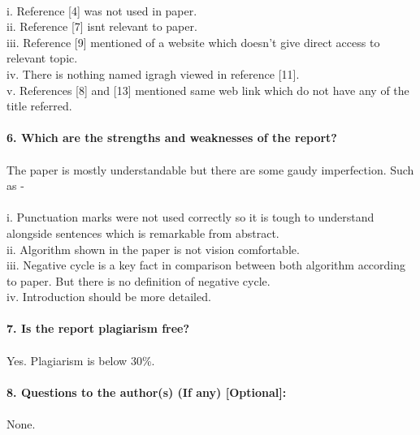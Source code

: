\documentclass[11pt,english]{article}
\begin{document}
  \\i. Reference [4] was not used in paper.\vspace{5pt}
  \\ii. Reference [7] isn\textsc{}t relevant to paper.\vspace{5pt}
  \\iii. Reference [9] mentioned of a website which doesn't give direct access to relevant topic.\vspace{5pt}
  \\iv. There is nothing named igragh viewed in reference [11].\vspace{5pt}
  \\v. References [8] and [13] mentioned same web link which do not have any of the title referred.\\\\
{\large \textbf{6. Which are the strengths and weaknesses of the report?}}\\\\
The paper is mostly understandable but there are some gaudy imperfection. Such as -\\
  \\i. Punctuation marks were not used correctly so it is tough to understand alongside sentences which is remarkable from abstract.\vspace{5pt}
  \\ii. Algorithm shown in the paper is not vision comfortable.\vspace{5pt}
  \\iii. Negative cycle is a key fact in comparison between both algorithm according to paper. But there is no definition of negative cycle.\vspace{5pt}
  \\iv. Introduction should be more detailed.\\\\
{\large \textbf{7. Is the report plagiarism free?}}\\\\
Yes. Plagiarism is below 30\%.\\\\
{\large \textbf{8. Questions to the author(s) (If any) [Optional]:}}\\\\
None.\\\\
\end{document}
